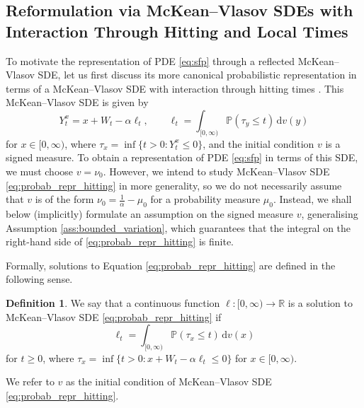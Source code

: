 \documentclass[11pt, a4paper]{article}
\theoremstyle{plain}
\theoremstyle{definition}
\newtheorem{definition}[theorem]{Definition}
\theoremstyle{remark}
\numberwithin{equation}{section}
\newcommand{\pr}{\mathbb{P}}
\newcommand{\R}{\mathbb{R}}
\renewcommand{\d}{\mathrm{d}}
\newcommand{\define}{\mathpunct{:}}
\begin{document}
\subsection{Reformulation via McKean--Vlasov SDEs with Interaction Through Hitting and Local Times}

To motivate the representation of PDE \eqref{eq:sfp} through a reflected McKean--Vlasov SDE, let us first discuss its more canonical probabilistic representation in terms of a McKean--Vlasov SDE with interaction through hitting times \cite{hambly_mckean_2019, nadtochiy_mean_field_2020, delarue_stefan_2022}. This McKean--Vlasov SDE is given by
\begin{equation} \label{eq:probab_repr_hitting}
    Y^x_t = x + W_t - \alpha \ell_t, \qquad \ell_t = \int_{[0, \infty)} \pr(\tau_y \leq t) \, \d v(y)
\end{equation}
for $x \in [0, \infty)$, where $\tau_x = \inf\{t > 0 \define Y^x_t \leq 0\}$, and the initial condition $v$ is a signed measure. To obtain a representation of PDE \eqref{eq:sfp} in terms of this SDE, we must choose $v = \nu_0$. However, we intend to study McKean--Vlasov SDE \eqref{eq:probab_repr_hitting} in more generality, so we do not necessarily assume that $v$ is of the form $\nu_0 = \frac{1}{\alpha} - \mu_0$ for a probability measure $\mu_0$. Instead, we shall below (implicitly) formulate an assumption on the signed measure $v$, generalising Assumption \ref{ass:bounded_variation}, which guarantees that the integral on the right-hand side of \eqref{eq:probab_repr_hitting} is finite.

Formally, solutions to Equation \eqref{eq:probab_repr_hitting} are defined in the following sense.

\begin{definition} \label{def:probab_repr_hitting}
We say that a continuous function $\ell \define [0, \infty) \to \R$ is a solution to McKean--Vlasov SDE \eqref{eq:probab_repr_hitting} if
\begin{equation} \label{eq:hitting_sol_prop}
    \ell_t = \int_{[0, \infty)} \pr(\tau_x \leq t) \, \d v(x)
\end{equation}
for $t \geq 0$, where $\tau_x = \inf\{t > 0 \define x + W_t - \alpha \ell_t \leq 0\}$ for $x \in [0, \infty)$.

We refer to $v$ as the initial condition of McKean--Vlasov SDE \eqref{eq:probab_repr_hitting}.
\end{definition}
\end{document}
